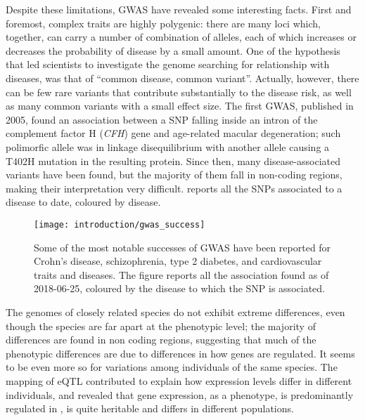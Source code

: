\documentclass[../main.tex]{subfiles}
\begin{document}
Despite these limitations, GWAS have revealed some interesting facts. 
First and foremost, complex traits are highly 
polygenic\autocite{Visscher2017}: there are many loci which, together, 
can carry a number of combination of alleles, each of which increases or 
decreases the probability of disease by a small amount. One of the 
hypothesis that led scientists to investigate the genome searching for 
relationship with diseases, was that of \enquote{common disease, common 
	variant}. Actually, however, there can be few rare variants that 
contribute substantially to the disease risk, as well as many common 
variants with a small effect size. The first GWAS, published in 2005, 
found an association between a SNP falling inside an intron of the 
complement factor H (\textit{CFH}) gene and age-related macular 
degeneration\autocite{Klein2005}; such polimorfic allele was in linkage 
disequilibrium with another allele causing a T402H mutation in the 
resulting protein. Since then, many disease-associated variants have 
been found, but the majority of them fall in non-coding regions, making 
their interpretation very difficult.  reports all 
the SNPs associated to a disease to date, coloured by disease.

\begin{figure}
	\centering
	\texttt{[image: introduction/gwas\_success]}
	\caption{Some of the most notable successes of GWAS have been 
reported for Crohn’s disease, schizophrenia, type 2 diabetes, and 
cardiovascular traits and diseases. The figure reports all the 
association found as of 2018-06-25, coloured by the disease to which the 
SNP is associated.}
\end{figure}

The genomes of closely related species do not exhibit extreme 
differences, even though the species are far apart at the phenotypic 
level; the majority of differences are found in non coding 
regions, 
suggesting that much of the phenotypic differences are due to 
differences in how genes are regulated. It seems to be even more so for 
variations among individuals of the same species. The mapping of eQTL 
contributed to explain how expression levels differ in different 
individuals, and revealed that gene expression, as a phenotype, is 
predominantly regulated in \cis, is quite heritable and differs in 
different populations\autocite{Gilad2008}.
\end{document}
